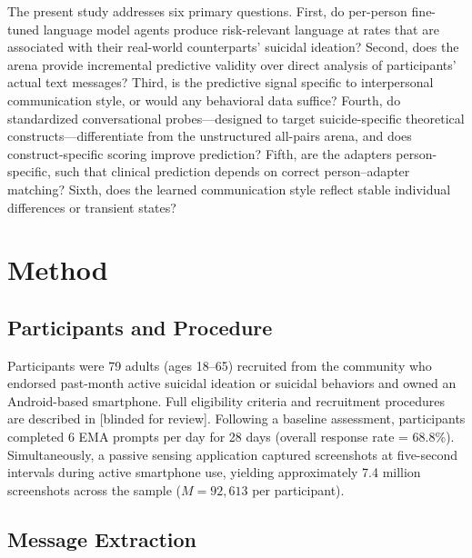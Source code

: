 \documentclass[review,12pt,authoryear]{elsarticle}
\begin{document}
The present study addresses six primary questions. First, do per-person fine-tuned language model agents produce risk-relevant language at rates that are associated with their real-world counterparts' suicidal ideation? Second, does the arena provide incremental predictive validity over direct analysis of participants' actual text messages? Third, is the predictive signal specific to interpersonal communication style, or would any behavioral data suffice? Fourth, do standardized conversational probes---designed to target suicide-specific theoretical constructs---differentiate from the unstructured all-pairs arena, and does construct-specific scoring improve prediction? Fifth, are the adapters person-specific, such that clinical prediction depends on correct person--adapter matching? Sixth, does the learned communication style reflect stable individual differences or transient states?


\section{Method}

\subsection{Participants and Procedure}

Participants were 79 adults (ages 18--65) recruited from the community who endorsed past-month active suicidal ideation or suicidal behaviors and owned an Android-based smartphone. Full eligibility criteria and recruitment procedures are described in [blinded for review]. Following a baseline assessment, participants completed 6 EMA prompts per day for 28 days (overall response rate = 68.8\%). Simultaneously, a passive sensing application captured screenshots at five-second intervals during active smartphone use, yielding approximately 7.4 million screenshots across the sample ($M = 92{,}613$ per participant).

\subsection{Message Extraction}
\end{document}

